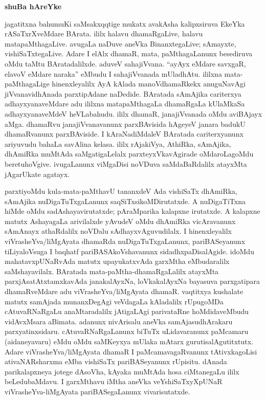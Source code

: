 \begin{center}
{\Huge\bfseries shuBa hAreYke}
\end{center}

\bigskip

jagatitxna bahumuKi saMsakxqqtige mukatx avakAsha kalipxsiruva EkeYka rASaTxrXveMdare BArata. ililx halavu dhamaRgaLive, halavu mata\-paMthagaLive. avugaLa naDuve aneVka BinanxtegaLive; sAmayxte, vishiSaTxtegaLive. Adare I elAlx dhamaR, mata, paMthagaLanunx besediruva oMdu taMtu BAratadalilxde. aduveV sahajiVvana. ``ayAyx eMdare savxgaR, elavoV eMdare naraka'' eMbudu I sahajiVvanada mUla\-dhAtu. ililxna mata-paMthagaLige hinenxleyalilx AyA kAlada manoVdhamaRkekx anuguNavAgi jiVvanavidhAnada parxtipAdane naDedide. BAratada sAmAjika cariterxya adhayxyanaveMdare adu ililxna matapaMthagaLa dhamaRgaLa kUlaMkaSa adhayxyanaveMdeV heVLabahudu. ililx dhamaR, janajiVvanada oMdu aviBAjayx aMga. dhamaRvu janajiVvanavanunx parxBAvisida hAgeyeV janara badukU dhamaRvanunx parxBAviside. I kAraNadiMdaleV BAratada cariterxyanunx ariyuvudu bahaLa savAlina kelasa. ililx rAjakiVya, AthiRka, sAmAjika, dhAmiRka muMtAda saMgatigaLelalx parxteyxVkavAgirade oMdaroLagoMdu beretuhoVgive. ivugaLanunx viMgaDisi noVDuva saMdaBaRdalilx atayxMta jAgarUkate agatayx.

parxtiyoMdu kula-mata-paMthavU tananxdeV Ada vishiSaTx dhAmiRka, sAmAjika nuDigaTuTxgaLanunx saqSiTxsikoMDirutatxde. A nuDigaTiTxna hiMde oMdu sadAshayavirutatxde; pAraMparika kalapxne irutatxde. A kalapxne matutx AshayagaLa arivilalxde yAvudeV oMdu dhAmiRka vicAravanunx sAmAnayx athaRdalilx noVDalu sAdhayxvAguvudilalx. I hinenxleyalilx viVrasheYva/liMgAyata dhamaRda nuDigaTuTxgaLanunx, pariBASeyanunx tiLiyaloVsuga I baqhatf pariBASAkoVshavanunx sidadhxpaDisalAgide. idoMdu mahatavxpUNaRvAda matutx upayukatxvAda garxMtha eMbudaralilx saMshayavilalx. BAratada mata-paMtha-dhamaRgaLalilx atayxMta parxjAsatAtxtamxkavAda janakalAyxNa, loVkakalAyxNa bayasuva parxgatipara dhamaRveMdare adu viVrasheYva/liMgAyata dhamaR. vaqtitxya kushalate matutx samAjada munanxDegAgi veVdagaLa kAladalilx rUpugoMDa cAtuvaRNaRgaLu anaMtaradalilx jAtigaLAgi parivataRne hoMdida\-veMbudu vidAvxMsara aBimata. adanunx nivArisalu aneVka samAjasudhArakaru parxyatinxsidaru. cAtuvaRNaRgaLanunx biTuTx uLidavaranunx paMcamaru (aidaneyavaru) eMdu oMdu saMKeyxya mUlaka mAtarx gurutisalAgutitxtutx. Adare viVrasheYva/liMgAyata dhamaR I paMcamavagaRvanunx tAtivxkagoLisi ativaNARsharxma eMba vishiSaTx pariBASeyanunx rUpisitu. dAnada parikalapxneya jotege dAsoVha, kAyaka muMtAda hosa ciMtanegaLu ililx beLedubaMdavu. I garxMthavu iMtha aneVka veYshiSaTxyXpUNaR viVrasheYva-\-liMgAyata pariBASegaLanunx vivarisutatxde.


